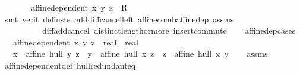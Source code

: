 \begin{isabellebody}
\ \ \ \ \isamarkupfalse%
\ \isamarkupfalse%
\ {\isachardoublequoteopen}affine{\isacharunderscore}{\kern0pt}dependent\ {\isacharbraceleft}{\kern0pt}x{\isacharcomma}{\kern0pt}\ y{\isacharcomma}{\kern0pt}\ z\ {\isacharcolon}{\kern0pt}{\isacharcolon}{\kern0pt}\ R{}{\isacharbraceright}{\kern0pt}{\isachardoublequoteclose}\isanewline
\ \ \ \ \ \ \isamarkupfalse%
\ {\isacharparenleft}{\kern0pt}smt\ {\isacharparenleft}{\kern0pt}verit{\isacharcomma}{\kern0pt}\ del{\isacharunderscore}{\kern0pt}insts{\isacharparenright}{\kern0pt}\ add{\isacharunderscore}{\kern0pt}diff{\isacharunderscore}{\kern0pt}cancel{\isacharunderscore}{\kern0pt}left{\isacharprime}{\kern0pt}\ affine{\isacharunderscore}{\kern0pt}comb{\isacharunderscore}{\kern0pt}affine{\isacharunderscore}{\kern0pt}dep\ assms{\isacharparenleft}{\kern0pt}{}{\isacharparenright}{\kern0pt}\isanewline
\ \ \ \ \ \ \ \ \ \ diff{\isacharunderscore}{\kern0pt}add{\isacharunderscore}{\kern0pt}cancel\ distinct{\isacharunderscore}{\kern0pt}length{\isacharunderscore}{\kern0pt}{}{\isacharunderscore}{\kern0pt}or{\isacharunderscore}{\kern0pt}more\ insert{\isacharunderscore}{\kern0pt}commute{\isacharparenright}{\kern0pt}\isanewline
\ \ \isamarkupfalse%
\isanewline
{}\isamarkupfalse%
%
\endisatagproof
{\isafoldproof}%
%
\isadelimproof
\isanewline
%
\endisadelimproof
\isanewline
{}\isamarkupfalse%
\ affinedep{\isacharunderscore}{\kern0pt}cases{\isacharcolon}{\kern0pt}\isanewline
\ \ \ {\isachardoublequoteopen}affine{\isacharunderscore}{\kern0pt}dependent\ {\isacharbraceleft}{\kern0pt}x{\isacharcomma}{\kern0pt}\ y{\isacharcomma}{\kern0pt}\ z\ {\isacharcolon}{\kern0pt}{\isacharcolon}{\kern0pt}\ real\ {\isasymtimes}\ real{\isacharbraceright}{\kern0pt}{\isachardoublequoteclose}\isanewline
\ \ \ {\isachardoublequoteopen}x\ {\isasymin}\ affine\ hull\ {\isacharbraceleft}{\kern0pt}y{\isacharcomma}{\kern0pt}\ z{\isacharbraceright}{\kern0pt}\ {\isasymor}\ y\ {\isasymin}\ affine\ hull\ {\isacharbraceleft}{\kern0pt}x{\isacharcomma}{\kern0pt}\ z{\isacharbraceright}{\kern0pt}\ {\isasymor}\ z\ {\isasymin}\ affine\ hull\ {\isacharbraceleft}{\kern0pt}x{\isacharcomma}{\kern0pt}\ y{\isacharbraceright}{\kern0pt}{\isachardoublequoteclose}\isanewline
%
\isadelimproof
\ \ %
\endisadelimproof
%
\isatagproof
{}\isamarkupfalse%
\ assms\ \isamarkupfalse%
\ affine{\isacharunderscore}{\kern0pt}dependent{\isacharunderscore}{\kern0pt}def\ hull{\isacharunderscore}{\kern0pt}redundant{\isacharunderscore}{\kern0pt}eq\isanewline

\end{isabellebody}

